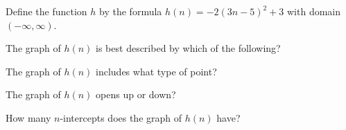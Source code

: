 \documentclass{ximera}
\begin{document}
\begin{definition}
Define the function $h$ by the formula $h(n) = -2(3n-5)^2+3$ with domain $(-\infty, \infty)$.

\end{definition}



\begin{exercise}
The graph of $h(n)$ is best described by which of the following?

\begin{multipleChoice}
\end{multipleChoice}

\end{exercise}




\begin{exercise}
The graph of $h(n)$ includes what type of point?

\begin{multipleChoice}
\end{multipleChoice}

\end{exercise}



\begin{exercise}
The graph of $h(n)$ opens up or down?

\begin{multipleChoice}
\end{multipleChoice}

\end{exercise}






\begin{exercise}
How many $n$-intercepts does the graph of $h(n)$ have?

\begin{multipleChoice}
\end{multipleChoice}

\end{exercise}
\end{document}
